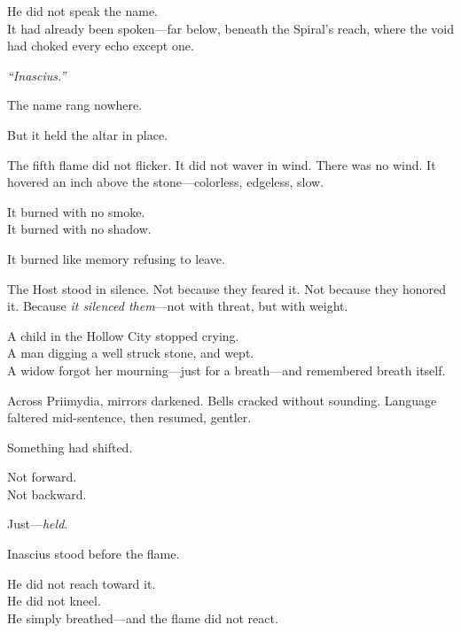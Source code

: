 \documentclass[12pt]{article}
\begin{document}
\vspace{0.5em}
He did not speak the name.\\
It had already been spoken---far below, beneath the Spiral’s reach, where the void had choked every echo except one.

\vspace{0.5em}
\textit{``Inascius.''}

\vspace{0.5em}
The name rang nowhere.

\vspace{0.5em}
But it held the altar in place.

\vspace{0.5em}
The fifth flame did not flicker. It did not waver in wind. There was no wind. It hovered an inch above the stone---colorless, edgeless, slow.

\vspace{0.5em}
It burned with no smoke.\\
It burned with no shadow.

\vspace{0.5em}
It burned like memory refusing to leave.

\vspace{0.5em}
The Host stood in silence. Not because they feared it. Not because they honored it. Because \textit{it silenced them}---not with threat, but with weight.

\vspace{0.5em}
A child in the Hollow City stopped crying.\\
A man digging a well struck stone, and wept.\\
A widow forgot her mourning---just for a breath---and remembered breath itself.

\vspace{0.5em}
Across Priimydia, mirrors darkened. Bells cracked without sounding. Language faltered mid-sentence, then resumed, gentler.

\vspace{0.5em}
Something had shifted.

\vspace{0.5em}
Not forward.\\
Not backward.

\vspace{0.5em}
Just---\textit{held}.

\vspace{0.5em}
Inascius stood before the flame.

\vspace{0.5em}
He did not reach toward it.\\
He did not kneel.\\
He simply breathed---and the flame did not react.
\end{document}
